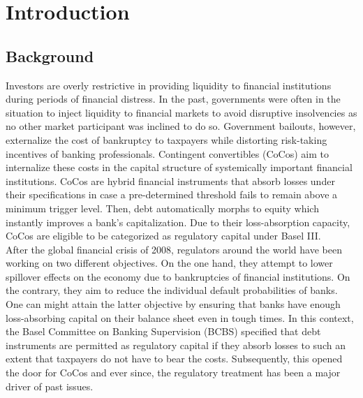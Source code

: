 \chapter{Introduction}

\section{Background}
Investors are overly restrictive in providing liquidity to financial institutions during periods of financial distress. In the past, governments were often in the situation to inject liquidity to financial markets to avoid disruptive insolvencies as no other market participant was inclined to do so. Government bailouts, however, externalize the cost of bankruptcy to taxpayers while distorting risk-taking incentives of banking professionals. Contingent convertibles (CoCos) aim to internalize these costs in the capital structure of systemically important financial institutions. CoCos are hybrid financial instruments that absorb losses under their specifications in case a pre-determined threshold fails to remain above a minimum trigger level. Then, debt automatically morphs to equity which instantly improves a bank's capitalization. Due to their loss-absorption capacity, CoCos are eligible to be categorized as regulatory capital under Basel III. \citep{avdjiev2013cocos} \\

After the global financial crisis of 2008, regulators around the world have been working on two different objectives. On the one hand, they attempt to lower spillover effects on the economy due to bankruptcies of financial institutions. On the contrary, they aim to reduce the individual default probabilities of banks. One can might attain the latter objective by ensuring that banks have enough loss-absorbing capital on their balance sheet even in tough times. \citep{de2011handbook} In this context, the Basel Committee on Banking Supervision (BCBS) specified that debt instruments are permitted as regulatory capital if they absorb losses to such an extent that taxpayers do not have to bear the costs. \citep{basel2011press} Subsequently, this opened the door for CoCos and ever since, the regulatory treatment has been a major driver of past issues.


